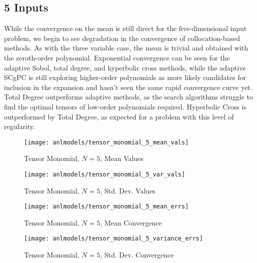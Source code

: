 \subsection{5 Inputs}
While the convergence on the mean is still direct for the five-dimensional input problem, we begin to see
degradation in the convergence of collocation-based methods.  
As with the three variable case, the mean is trivial and obtained with the zeroth-order polynomial.  Exponential
convergence can be seen for the adaptive Sobol, total degree, and hyperbolic cross methods, while the adaptive SCgPC
is still exploring higher-order polynomials as more likely candidates for inclusion in the expansion and hasn't
seen the same rapid convergence curve yet.
Total Degree outperforms adaptive methods, as
the search algorithms struggle to find the optimal tensors of low-order polynomials required.  Hyperbolic
Cross is outperformed by Total Degree, as expected for a problem with this level of regularity.
\begin{figure}[H]
  \centering
  \texttt{[image: anlmodels/tensor\_monomial\_5\_mean\_vals]}
  \caption{Tensor Monomial, $N=5$, Mean Values}
  \label{fig:tensormono mean values 5}
\end{figure}
\begin{figure}[H]
  \centering
  \texttt{[image: anlmodels/tensor\_monomial\_5\_var\_vals]}
  \caption{Tensor Monomial, $N=5$, Std. Dev. Values}
  \label{fig:tensormono var values 5}
\end{figure}

\begin{figure}[H]
  \centering
  \texttt{[image: anlmodels/tensor\_monomial\_5\_mean\_errs]}
  \caption{Tensor Monomial, $N=5$, Mean Convergence}
  \label{fig:tensormono mean errors 5}
\end{figure}
\begin{figure}[H]
  \centering
  \texttt{[image: anlmodels/tensor\_monomial\_5\_variance\_errs]}
  \caption{Tensor Monomial, $N=5$, Std. Dev. Convergence}
  \label{fig:tensormono var errors 5}
\end{figure}

